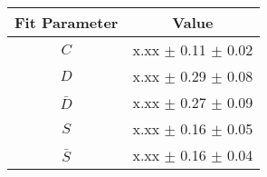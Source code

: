 \begin{tabular}{c r } 
\hline
\hline
Fit Parameter & \multicolumn{1}{c}{Value}  \\ 
\hline
$C$ & x.xx $\pm$ 0.11 $\pm$ 0.02 \\ 
$D$ & x.xx $\pm$ 0.29 $\pm$ 0.08 \\ 
$\bar{D}$ & x.xx $\pm$ 0.27 $\pm$ 0.09 \\ 
$S$ & x.xx $\pm$ 0.16 $\pm$ 0.05 \\ 
$\bar{S}$ & x.xx $\pm$ 0.16 $\pm$ 0.04 \\ 
\hline
\hline
\end{tabular}
